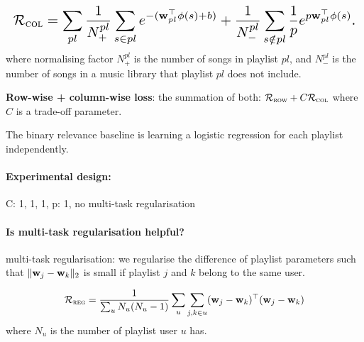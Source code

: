 \begin{equation*}
\resizebox{\linewidth}{!}{$
\RCal_\textsc{col} 
= \displaystyle \sum_{pl}
  \frac{1}{N_+^{pl}} \sum_{s \in pl} e^{-(\w_{pl}^\top \phi(s) + b)} +
  \frac{1}{N_-^{pl}} \sum_{s \notin pl} \frac{1}{p} e^{p \w_{pl}^\top \phi(s)}.
$}
\end{equation*}
where normalising factor $N_+^{pl}$ is the number of songs in playlist $pl$,
and $N_-^{pl}$ is the number of songs in a music library that playlist $pl$ does not include.


{\bf Row-wise + column-wise loss}: the summation of both: $\mathcal{R}_\textsc{row} + C \mathcal{R}_\textsc{col}$ 
where $C$ is a trade-off parameter.

The binary relevance baseline is learning a logistic regression for each playlist independently.


\begin{table}[!h]
\centering
\caption{Empirical results}
\end{table}

\paragraph{Experimental design:}
C: 1, 1, 1, p: 1, no multi-task regularisation

\paragraph{Is multi-task regularisation helpful?}

multi-task regularisation: we regularise the difference of playlist parameters 
such that $\|\mathbf{w}_j - \mathbf{w}_k\|_2$ is small if playlist $j$ and $k$ belong to the same user.

\begin{equation*}
\mathcal{R}_\textsc{reg} = \frac{1}{\sum_u N_u (N_u - 1)} \sum_u \sum_{j, k \in u} (\mathbf{w}_j - \mathbf{w}_k)^\top (\mathbf{w}_j - \mathbf{w}_k)
\end{equation*}
where $N_u$ is the number of playlist user $u$ has.

